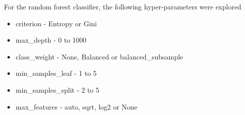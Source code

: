 For the random forest classifier, the following hyper-parameters were explored

\begin{itemize}
  \item criterion - Entropy or Gini
  \item max\_depth - 0 to 1000
  \item class\_weight - None, Balanced or balanced\_subsample
  \item min\_samples\_leaf - 1 to 5
  \item min\_samples\_split - 2 to 5
  \item max\_features - auto, sqrt, log2 or None
\end{itemize}